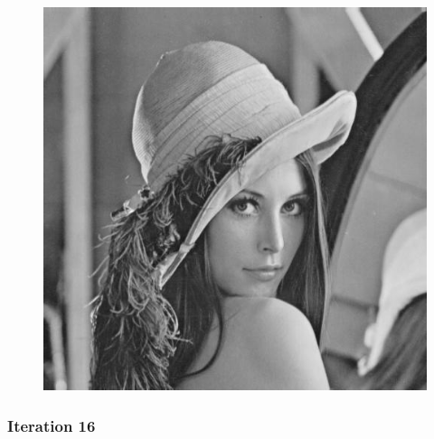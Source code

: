 \documentclass[11pt]{article}
\makeatletter
\def\maxwidth{\ifdim\Gin@nat@width>\linewidth\linewidth
    \else\Gin@nat@width\fi}
\let\Oldincludegraphics\includegraphics
\renewcommand{\includegraphics}[1]{\Oldincludegraphics[width=.8\maxwidth]{#1}}
\makeatother
\begin{document}
\begin{figure}[!htbp]
	\centering
	\includegraphics{"7th iterations_varying"}
	\label{fig:7th-iterationsvarying}
\end{figure}
\clearpage
    \hypertarget{iteration-16}{%
\subsubsection{Iteration 16}\label{iteration-16}}
\end{document}
